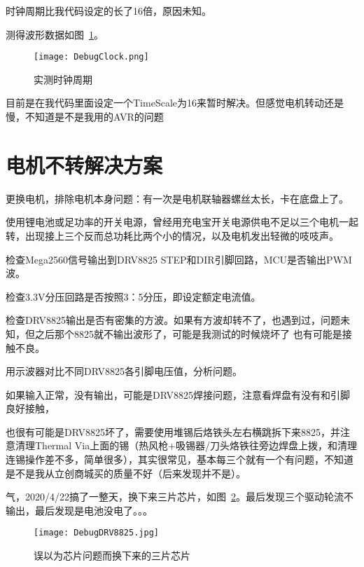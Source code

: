 时钟周期比我代码设定的长了16倍，原因未知。



测得波形数据如图~\ref{fig:DebugClock}。

\begin{figure}[htbp]
    \centering
    \texttt{[image: DebugClock.png]}
    \caption{实测时钟周期}
    \label{fig:DebugClock}
\end{figure}

目前是在我代码里面设定一个TimeScale为16来暂时解决。但感觉电机转动还是慢，不知道是不是我用的AVR的问题

\section{电机不转解决方案}

更换电机，排除电机本身问题：有一次是电机联轴器螺丝太长，卡在底盘上了。

使用锂电池或足功率的开关电源，曾经用充电宝开关电源供电不足以三个电机一起转，出现接上三个反而总功耗比两个小的情况，以及电机发出轻微的吱吱声。

检查Mega2560信号输出到DRV8825 STEP和DIR引脚回路，MCU是否输出PWM波。

检查3.3V分压回路是否按照3：5分压，即设定额定电流值。

检查DRV8825输出是否有密集的方波。如果有方波却转不了，也遇到过，问题未知，但之后那个8825就不输出波形了，可能是我测试的时候烧坏了
也有可能是接触不良。

用示波器对比不同DRV8825各引脚电压值，分析问题。

如果输入正常，没有输出，可能是DRV8825焊接问题，注意看焊盘有没有和引脚良好接触，

也很有可能是DRV8825坏了，需要使用堆锡后烙铁头左右横跳拆下来8825，并注意清理Thermal Via上面的锡（热风枪+吸锡器/刀头烙铁往旁边焊盘上拨，和清理连锡操作差不多，简单很多），其实很常见，基本每三个就有一个有问题，不知道是不是我从立创商城买的质量不好（后来发现并不是）。

气，2020/4/22搞了一整天，换下来三片芯片，如图~\ref{fig:DebugDRV8825}。最后发现三个驱动轮流不输出，最后发现是电池没电了。。。

\begin{figure}[htbp]
    \centering
    \texttt{[image: DebugDRV8825.jpg]}
    \caption{误以为芯片问题而换下来的三片芯片}
    \label{fig:DebugDRV8825}
\end{figure}

